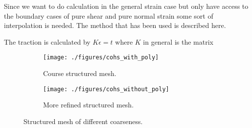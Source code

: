 \documentclass[generate_interface_elements.tex]{subfiles}
\begin{document}
Since we want to do calculation in the general strain case but only have access to the boundary cases of pure shear and pure normal strain some sort of interpolation is needed. The method that has been used is described here.

 

The traction is calculated by $K \epsilon = t$ where $K$ in general is the matrix



\begin{figure}
\centering
\begin{subfigure}[b]{.5\textwidth}
  \centering
  \texttt{[image: ./figures/cohs\_with\_poly]}
  \caption{Course structured mesh.}
  \label{fig:pois_voronoi_struct_a}
\end{subfigure}%
\begin{subfigure}[b]{.5\textwidth}
  \centering
  \texttt{[image: ./figures/cohs\_without\_poly]}
  \caption{More refined structured mesh.}
  \label{fig:pois_voronoi_struct_b}
\end{subfigure}
\caption{Structured mesh of different coarseness.}
\label{fig:pois_voronoi_struct}
\end{figure}
\end{document}
